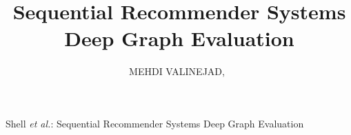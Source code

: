 \documentclass[journal]{IEEEtran}
\begin{document}
%
\title{Sequential Recommender Systems Deep Graph Evaluation}
%
%
%

\author{MEHDI VALINEJAD,~%
}

% 
%



%
{Shell \MakeLowercase{\textit{et al.}}: Sequential Recommender Systems Deep Graph Evaluation}
% 
\end{document}
